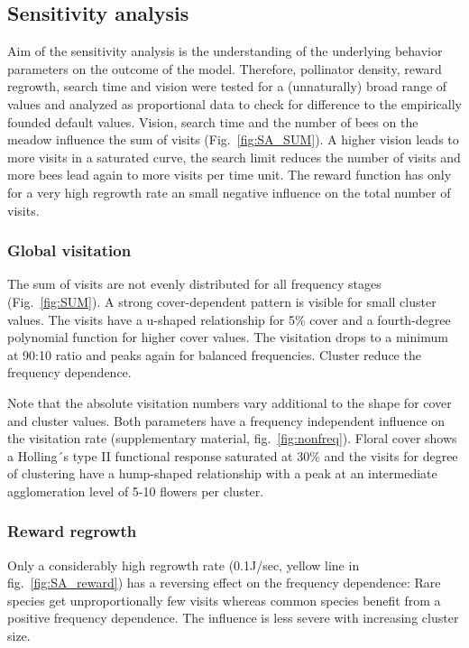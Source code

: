 \subsection*{Sensitivity analysis}
Aim of the sensitivity analysis is the understanding of the underlying behavior parameters on the outcome of the model. Therefore, pollinator density, reward regrowth, search time and vision were tested for a (unnaturally) broad range of values and analyzed as proportional data to check for difference to the empirically founded default values. Vision, search time and the number of bees on the meadow influence the sum of visits (Fig.~\ref{fig:SA_SUM}). A higher vision leads to more visits in a saturated curve, the search limit reduces the number of visits and more bees lead again to more visits per time unit. The reward function has only for a very high regrowth rate an small negative influence on the total number of visits.

\subsubsection*{Global visitation}
The sum of visits are not evenly distributed for all frequency stages (Fig.~\ref{fig:SUM}). A strong cover-dependent pattern is visible for small cluster values. The visits have a u-shaped relationship for 5\% cover and a fourth-degree polynomial function for higher cover values. The visitation drops to a minimum at 90:10 ratio and peaks again for balanced frequencies. Cluster reduce the frequency dependence. 

Note that the absolute visitation numbers vary additional to the shape for cover and cluster values. Both parameters have a frequency independent influence on the visitation rate (supplementary material, fig.~\ref{fig:nonfreq}). Floral cover shows a Holling´s type II functional response saturated at 30\% and the visits for degree of clustering have a hump-shaped relationship with a peak at an intermediate agglomeration level of 5-10 flowers per cluster.

\subsubsection*{Reward regrowth}
Only a considerably high regrowth rate (0.1J/sec, yellow line in fig.~\ref{fig:SA_reward}) has a reversing effect on the frequency dependence: Rare species get unproportionally few visits whereas common species benefit from a positive frequency dependence. The influence is less severe with increasing cluster size. 

